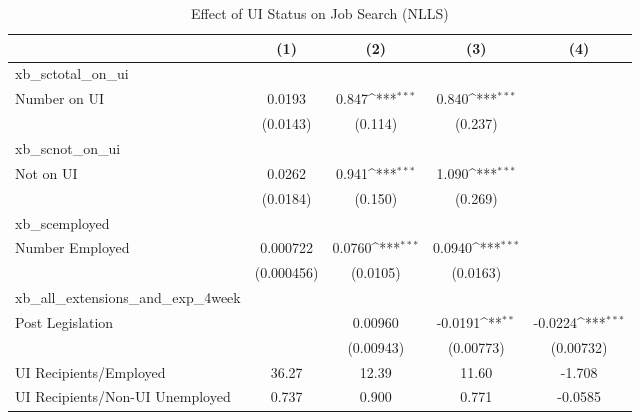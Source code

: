\begin{table}[htbp]\centering
\def\sym#1{\ifmmode^{#1}\else\(^{#1}\)\fi}
\caption{Effect of UI Status on Job Search (NLLS) \label{tab:nlls2}}
\begin{tabular}{l*{4}{c}}
\hline\hline
                    &\multicolumn{1}{c}{(1)}         &\multicolumn{1}{c}{(2)}         &\multicolumn{1}{c}{(3)}         &\multicolumn{1}{c}{(4)}         \\
\hline
xb\_sctotal\_on\_ui    &                     &                     &                     &                     \\
Number on UI        &      0.0193         &       0.847\sym{***}&       0.840\sym{***}&                     \\
                    &    (0.0143)         &     (0.114)         &     (0.237)         &                     \\
\hline
xb\_scnot\_on\_ui      &                     &                     &                     &                     \\
Not on UI           &      0.0262         &       0.941\sym{***}&       1.090\sym{***}&                     \\
                    &    (0.0184)         &     (0.150)         &     (0.269)         &                     \\
\hline
xb\_scemployed       &                     &                     &                     &                     \\
Number Employed     &    0.000722         &      0.0760\sym{***}&      0.0940\sym{***}&                     \\
                    &  (0.000456)         &    (0.0105)         &    (0.0163)         &                     \\
\hline
xb\_all\_extensions\_and\_exp\_4week&                     &                     &                     &                     \\
Post Legislation    &                     &     0.00960         &     -0.0191\sym{**} &     -0.0224\sym{***}\\
                    &                     &   (0.00943)         &   (0.00773)         &   (0.00732)         \\
\hline
UI Recipients/Employed&       36.27         &       12.39         &       11.60         &      -1.708         \\
UI Recipients/Non-UI Unemployed&       0.737         &       0.900         &       0.771         &     -0.0585         \\

\end{tabular}
\end{table}
